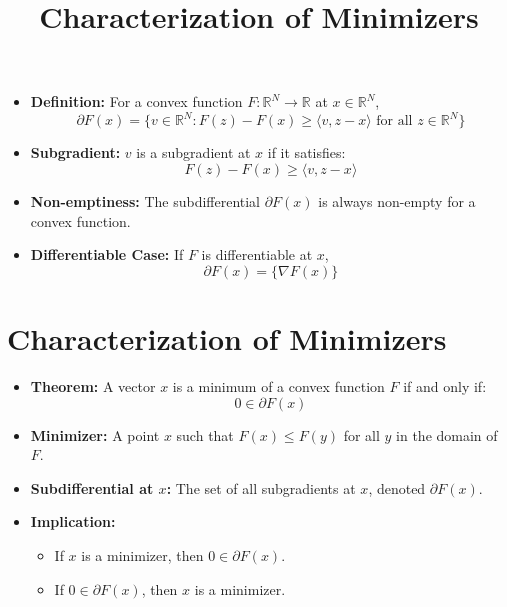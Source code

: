 \documentclass{article}
\begin{document}
\begin{itemize}
    \item \textbf{Definition:} For a convex function \( F : \mathbb{R}^N \to \mathbb{R} \) at \( x \in \mathbb{R}^N \),
    \[
    \partial F(x) = \{ v \in \mathbb{R}^N : F(z) - F(x) \geq \langle v, z - x \rangle \text{ for all } z \in \mathbb{R}^N \}
    \]
    
    \item \textbf{Subgradient:} \( v \) is a subgradient at \( x \) if it satisfies:
    \[
    F(z) - F(x) \geq \langle v, z - x \rangle
    \]
    
    \item \textbf{Non-emptiness:} The subdifferential \( \partial F(x) \) is always non-empty for a convex function.
    
    \item \textbf{Differentiable Case:} If \( F \) is differentiable at \( x \),
    \[
    \partial F(x) = \{ \nabla F(x) \}
    \]
\end{itemize}









\title{Characterization of Minimizers}
\date{}




\section*{Characterization of Minimizers}

\begin{itemize}
    \item \textbf{Theorem:} A vector $x$ is a minimum of a convex function $F$ if and only if:
    \[
    0 \in \partial F(x)
    \]
    
    \item \textbf{Minimizer:} A point $x$ such that $F(x) \leq F(y)$ for all $y$ in the domain of $F$.
    
    \item \textbf{Subdifferential at $x$:} The set of all subgradients at $x$, denoted $\partial F(x)$.
    
    \item \textbf{Implication:}
    \begin{itemize}
        \item If $x$ is a minimizer, then $0 \in \partial F(x)$.
        \item If $0 \in \partial F(x)$, then $x$ is a minimizer.
    \end{itemize}
\end{itemize}
\end{document}
